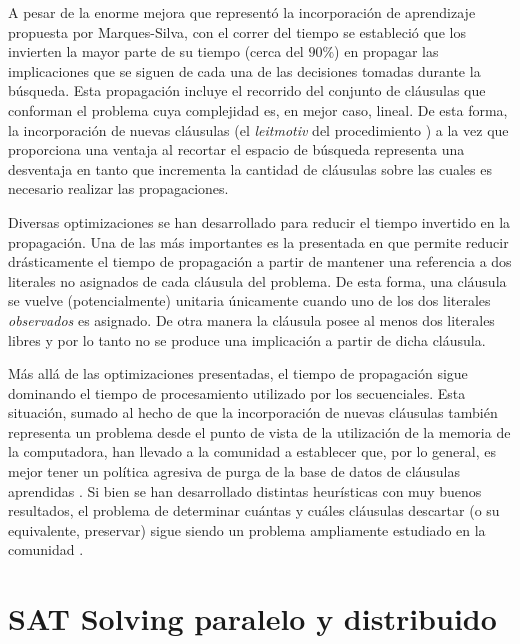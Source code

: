 A pesar de la enorme mejora que representó la incorporación de aprendizaje
propuesta por Marques-Silva, con el correr del tiempo se estableció que los
\ssolvers invierten la mayor parte de su tiempo (cerca del $90\%$) en propagar
las implicaciones que se siguen de cada una de las decisiones tomadas durante
la búsqueda. Esta propagación incluye el recorrido del conjunto de cláusulas
que conforman el problema cuya complejidad es, en mejor caso, lineal. De esta
forma, la incorporación de nuevas cláusulas (el \emph{leitmotiv} del
procedimiento \CDCL) a la vez que proporciona una ventaja al recortar el
espacio de búsqueda representa una desventaja en tanto que incrementa la
cantidad de cláusulas sobre las cuales es necesario realizar las
propagaciones.

Diversas optimizaciones se han desarrollado para reducir el tiempo invertido
en la propagación. Una de las más importantes es la presentada en
\cite{moskewicz:da01} que permite reducir drásticamente el tiempo de
propagación a partir de mantener una referencia a dos literales no asignados
de cada cláusula del problema. De esta forma, una cláusula se vuelve
(potencialmente) unitaria únicamente cuando uno de los dos literales
\emph{observados} es asignado. De otra manera la cláusula posee al menos dos
literales libres y por lo tanto no se produce una implicación a partir de
dicha cláusula.

Más allá de las optimizaciones presentadas, el tiempo de propagación sigue
dominando el tiempo de procesamiento utilizado por los \ssolvers secuenciales.
Esta situación, sumado al hecho de que la incorporación de nuevas cláusulas
también representa un problema desde el punto de vista de la utilización de la
memoria de la computadora, han llevado a la comunidad a establecer que, por lo
general, es mejor tener un política agresiva de purga de la base de datos de
cláusulas aprendidas \cite{Audemard:2009:PLC:1661445.1661509}. Si bien se han
desarrollado distintas heurísticas con muy buenos resultados, el problema de
determinar cuántas y cuáles cláusulas descartar (o su equivalente, preservar)
sigue siendo un problema ampliamente estudiado en la comunidad \sat.


\section{SAT Solving paralelo y distribuido}


